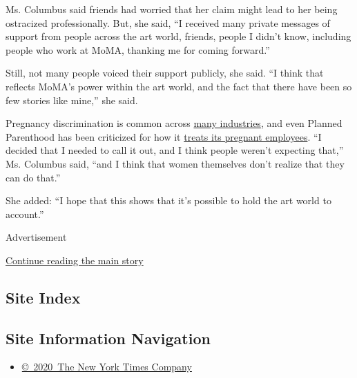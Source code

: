 Ms. Columbus said friends had worried that her claim might lead to her
being ostracized professionally. But, she said, ``I received many
private messages of support from people across the art world, friends,
people I didn't know, including people who work at MoMA, thanking me for
coming forward.''

Still, not many people voiced their support publicly, she said. ``I
think that reflects MoMA's power within the art world, and the fact that
there have been so few stories like mine,'' she said.

Pregnancy discrimination is common across
\href{https://www.nytimes3xbfgragh.onion/interactive/2018/06/15/business/pregnancy-discrimination.html}{many
industries}, and even Planned Parenthood has been criticized for how it
\href{https://www.nytimes3xbfgragh.onion/2018/12/20/business/planned-parenthood-pregnant-employee-discrimination-women.html}{treats
its pregnant employees}. ``I decided that I needed to call it out, and I
think people weren't expecting that,'' Ms. Columbus said, ``and I think
that women themselves don't realize that they can do that.''

She added: ``I hope that this shows that it's possible to hold the art
world to account.''

Advertisement

\protect\hyperlink{after-bottom}{Continue reading the main story}

\hypertarget{site-index}{%
\subsection{Site Index}\label{site-index}}

\hypertarget{site-information-navigation}{%
\subsection{Site Information
Navigation}\label{site-information-navigation}}

\begin{itemize}
\tightlist
\item
  \href{https://help.nytimes3xbfgragh.onion/hc/en-us/articles/115014792127-Copyright-notice}{©~2020~The
  New York Times Company}
\end{itemize}

